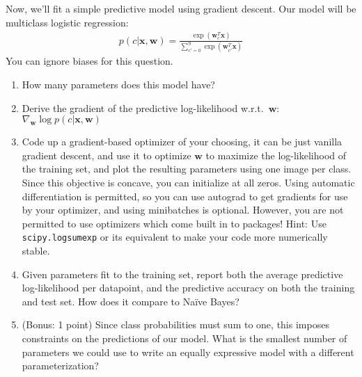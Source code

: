 \documentclass{harvardml}
\newcommand{\bx}{\mathbf{x}}
\newcommand{\bw}{\mathbf{w}}
\theoremstyle{plain}
\begin{document}
\begin{problem}

Now, we'll fit a simple predictive model using gradient descent.  Our model will be multiclass logistic regression:
\begin{align}
p(c | \bx, \bw) = \frac{\exp(\bw_c^T \bx)}{\sum_{c' = 0}^9 \exp(\bw_{c'}^T \bx)}
\end{align}
You can ignore biases for this question.
\begin{enumerate}[label=(\alph*)]
\item How many parameters does this model have?
\item Derive the gradient of the predictive log-likelihood w.r.t.\ $\bw$: $\nabla_{\bw} \log p(c | \bx, \bw)$
\item Code up a gradient-based optimizer of your choosing, it can be just vanilla gradient descent, and use it to optimize $\bw$ to maximize the log-likelihood of the training set, and plot the resulting parameters using one image per class.  Since this objective is concave, you can initialize at all zeros.  Using automatic differentiation is permitted, so you can use autograd to get gradients for use by your optimizer, and using minibatches is optional. However, you are not permitted to use optimizers which come built in to packages! Hint: Use \texttt{scipy.logsumexp} or its equivalent to make your code more numerically stable.
\item Given parameters fit to the training set, report both the average predictive log-likelihood per datapoint, and the predictive accuracy on both the training and test set.  How does it compare to Na\"ive Bayes?
\item (Bonus: 1 point) Since class probabilities must sum to one, this imposes constraints on the predictions of our model.  What is the smallest number of parameters we could use to write an equally expressive model with a different parameterization?
\end{enumerate}
\end{problem}



\end{document}

